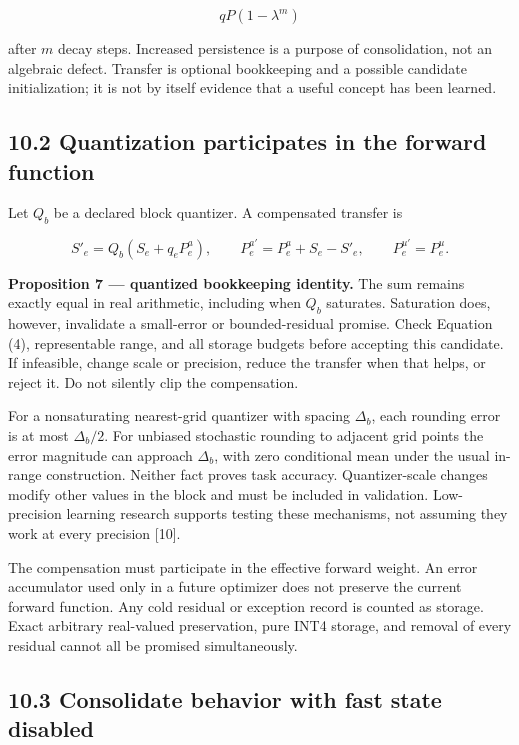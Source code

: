 \documentclass[
  11pt,
  a4paper,
]{article}
\begin{document}
\[
qP(1-\lambda^m)
\tag{28}
\]

after \(m\) decay steps. Increased persistence is a purpose of
consolidation, not an algebraic defect. Transfer is optional bookkeeping
and a possible candidate initialization; it is not by itself evidence
that a useful concept has been learned.

\subsection{10.2 Quantization participates in the forward
function}\label{quantization-participates-in-the-forward-function}

Let \(Q_b\) be a declared block quantizer. A compensated transfer is

\[
S'_e=Q_b(S_e+q_eP_e^a),\qquad
P_e^{a\prime}=P_e^a+S_e-S'_e,
\qquad P_e^{u\prime}=P_e^u.
\tag{29}
\]

\textbf{Proposition 7 --- quantized bookkeeping identity.} The sum
remains exactly equal in real arithmetic, including when \(Q_b\)
saturates. Saturation does, however, invalidate a small-error or
bounded-residual promise. Check Equation (4), representable range, and
all storage budgets before accepting this candidate. If infeasible,
change scale or precision, reduce the transfer when that helps, or
reject it. Do not silently clip the compensation.

For a nonsaturating nearest-grid quantizer with spacing \(\Delta_b\),
each rounding error is at most \(\Delta_b/2\). For unbiased stochastic
rounding to adjacent grid points the error magnitude can approach
\(\Delta_b\), with zero conditional mean under the usual in-range
construction. Neither fact proves task accuracy. Quantizer-scale changes
modify other values in the block and must be included in validation.
Low-precision learning research supports testing these mechanisms, not
assuming they work at every precision {[}10{]}.

The compensation must participate in the effective forward weight. An
error accumulator used only in a future optimizer does not preserve the
current forward function. Any cold residual or exception record is
counted as storage. Exact arbitrary real-valued preservation, pure INT4
storage, and removal of every residual cannot all be promised
simultaneously.

\subsection{10.3 Consolidate behavior with fast state
disabled}\label{consolidate-behavior-with-fast-state-disabled}
\end{document}
